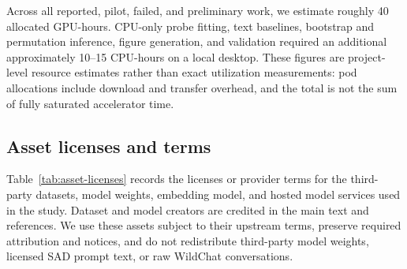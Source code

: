 \documentclass{article}
\begin{document}
Across all reported, pilot, failed, and preliminary work, we estimate roughly
40 allocated GPU-hours. CPU-only probe fitting, text baselines, bootstrap and
permutation inference, figure generation, and validation required an additional
approximately 10--15 CPU-hours on a local desktop. These figures are
project-level resource estimates rather than exact utilization measurements:
pod allocations include download and transfer overhead, and the total is not
the sum of fully saturated accelerator time.

\subsection{Asset licenses and terms}

Table~\ref{tab:asset-licenses} records the licenses or provider terms for the
third-party datasets, model weights, embedding model, and hosted model services
used in the study. Dataset and model creators are credited in the main text and
references. We use these assets subject to their upstream terms, preserve
required attribution and notices, and do not redistribute third-party model
weights, licensed SAD prompt text, or raw WildChat conversations.
\end{document}
